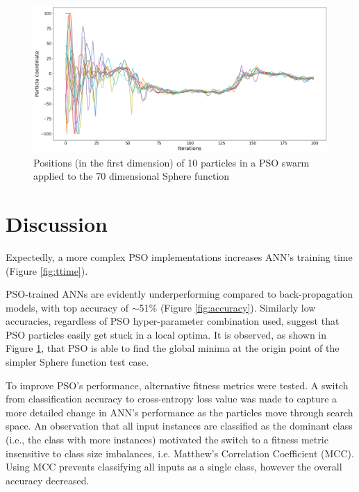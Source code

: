 \documentclass[12pt]{article}
\begin{document}
\begin{figure}[H]
  \centering
  \includegraphics[width=1\textwidth]{figs/sphere_pso.png}
  \caption{Positions (in the first dimension) of 10 particles in a PSO swarm applied to the 70 dimensional Sphere function}
  \label{fig:sphere}
\end{figure}

\vspace{-1.5em}
\section{Discussion}

Expectedly, a more complex PSO implementations increases ANN's training time (Figure \ref{fig:ttime}).

PSO-trained ANNs are evidently underperforming compared to back-propagation models, with top accuracy of $\sim$51\% (Figure \ref{fig:accuracy}). Similarly low accuracies, regardless of PSO hyper-parameter combination used, suggest that PSO particles easily get stuck in a local optima. It is observed, as shown in Figure \ref{fig:sphere}, that PSO is able to find the global minima at the origin point of the simpler Sphere function test case.

To improve PSO's performance, alternative fitness metrics were tested. A switch from classification accuracy to cross-entropy loss value was made to capture a more detailed change in ANN's performance as the particles move through search space.  An observation that all input instances are classified as the dominant class (i.e., the class with more instances) motivated the switch to a fitness metric insensitive to class size  imbalances, i.e. Matthew's Correlation Coefficient (MCC). Using MCC prevents classifying all inputs as a single class, however the overall accuracy decreased.
\end{document}
